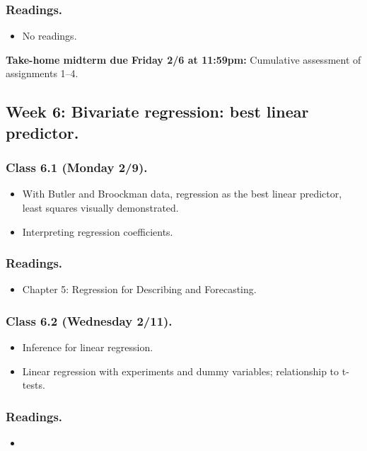 \documentclass[letterpaper, 12pt, parskip=full,DIV=10]{scrartcl}
\begin{document}
\subsubsection*{Readings.}
\begin{itemize}
\item No readings.
\end{itemize}

\textbf{Take-home midterm due Friday 2/6 at 11:59pm:}
Cumulative assessment of assignments 1--4.

\subsection*{Week 6: Bivariate regression: best linear predictor.}
\subsubsection*{Class 6.1 (Monday 2/9).}
\begin{itemize}
\item With Butler and Broockman data, regression as the best linear predictor, least squares visually demonstrated.
\item Interpreting regression coefficients.
\end{itemize}

\subsubsection*{Readings.}
\begin{itemize}
\item {} Chapter 5: Regression for Describing and Forecasting.
\end{itemize}

\subsubsection*{Class 6.2 (Wednesday 2/11).}
\begin{itemize}
\item Inference for linear regression.
\item Linear regression with experiments and dummy variables; relationship to t-tests.
\end{itemize}

\subsubsection*{Readings.}
\begin{itemize}
\item {}
\end{itemize}
\end{document}
